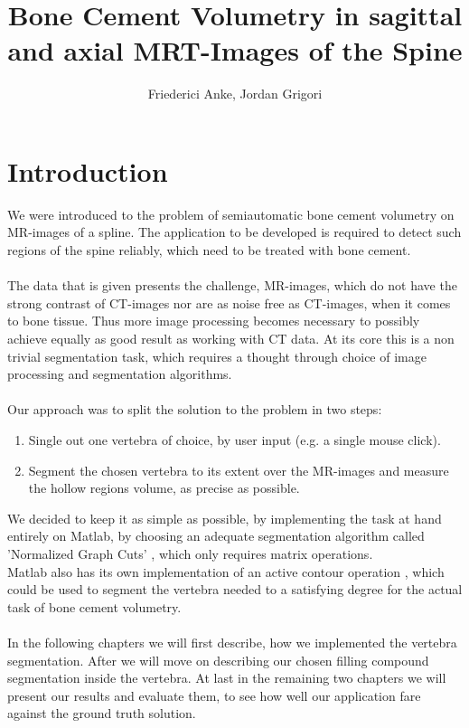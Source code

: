 \documentclass{article}
\title{Bone Cement Volumetry in sagittal and axial MRT-Images of the Spine}
\author{Friederici Anke, Jordan Grigori}
\begin{document}
  
  \maketitle
  \thispagestyle{empty}
  \pagebreak
  
  \section{Introduction}
  \setcounter{page}{1}
  {
  	We were introduced to the problem of semiautomatic bone cement volumetry 
  	on MR-images of a spline. The application to be developed is required 
  	to detect such regions of the spine reliably, which need to be treated with 
  	bone cement.\\
  	\\The data that is given presents the challenge, MR-images, which do not have
  	the strong contrast of CT-images nor are as noise free as CT-images, when it
  	comes to bone tissue. Thus more image processing becomes necessary to possibly 
  	achieve equally as good result as working with CT data.
  	At its core this is a non trivial segmentation task, which requires a thought 
  	through choice of image processing and segmentation algorithms.\\
  	\\Our approach was to split the solution to the problem in two steps:
  	\begin{enumerate}
  		\item Single out one vertebra of choice, by user input (e.g. a single mouse click).
  		\item Segment the chosen vertebra to its extent over the MR-images and measure the hollow regions volume, as precise as possible.
  	\end{enumerate}
  	We decided to keep it as simple as possible, by implementing the task at hand 
  	entirely on Matlab, by choosing an adequate segmentation algorithm called 
  	'Normalized Graph Cuts' \cite{[ShiMalik00]}, which only requires matrix operations.
  	\\Matlab also has its own implementation of an active contour
  	operation \cite{[ChanVese01]}, which could be used to segment the vertebra needed to a satisfying degree for the actual task of bone cement volumetry.\\	
  	\\In the following chapters we will first describe, how we implemented the vertebra segmentation.
  	After we will move on describing our chosen filling compound segmentation inside the vertebra.
  	At last in the remaining two chapters we will present our results and evaluate them, to see how well our application fare against the ground truth solution.
  }
  
\end{document}
